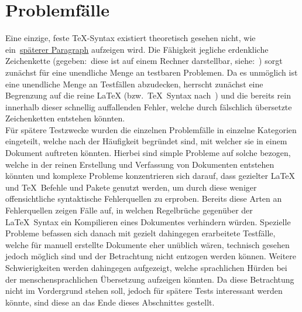 
\section{Problemfälle}
Eine einzige, feste \TeX{}-Syntax existiert theoretisch gesehen nicht, wie ein~\hyperref[par:catcode]{späterer Paragraph} aufzeigen wird.%
Die Fähigkeit jegliche erdenkliche Zeichenkette (gegeben:\ diese ist auf einem Rechner darstellbar, siehe:~\cite{unicode}) sorgt zunächst für eine unendliche Menge an testbaren Problemen. Da es unmöglich ist eine unendliche Menge an Testfällen abzudecken, herrscht zunächst eine Begrenzung auf die reine \LaTeX{} (bzw.\ \TeX{}~Syntax nach~\cite{texbook}) und die bereits rein innerhalb dieser schnellig auffallenden Fehler, welche durch fälschlich übersetzte Zeichenketten entstehen könnten.\\\noindent
Für spätere Testzwecke wurden die einzelnen Problemfälle in einzelne Kategorien eingeteilt, welche nach der Häufigkeit begründet sind, mit welcher sie in einem Dokument auftreten könnten. Hierbei sind simple Probleme auf solche bezogen, welche in der reinen Erstellung und Verfassung von Dokumenten entstehen könnten und komplexe Probleme konzentrieren sich darauf, dass gezielter \LaTeX{} und \TeX{}~Befehle und Pakete genutzt werden, um durch diese weniger offensichtliche syntaktische Fehlerquellen zu erproben. Bereits diese Arten an Fehlerquellen zeigen Fälle auf, in welchen Regelbrüche gegenüber der \LaTeX{}~Syntax ein Kompilieren eines Dokumentes verhindern würden. Spezielle Probleme befassen sich danach mit gezielt dahingegen erarbeitete Testfälle, welche für manuell erstellte Dokumente eher unüblich wären, technisch gesehen jedoch möglich sind und der Betrachtung nicht entzogen werden können. Weitere Schwierigkeiten werden dahingegen aufgezeigt, welche sprachlichen Hürden bei der menschensprachlichen Übersetzung aufzeigen könnten. Da diese Betrachtung nicht im Vordergrund stehen soll, jedoch für spätere Tests interessant werden könnte, sind diese an das Ende dieses Abschnittes gestellt.





